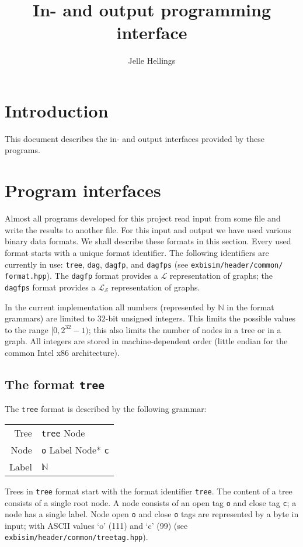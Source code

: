 \documentclass{article}
\title{In- and output programming interface}
\author{Jelle Hellings}
\makeatletter
\newenvironment{grammar}{\begin{tabular}{r@{ $~\longleftarrow~$ }l}}{\end{tabular}}
\newcommand{\grammarrule}[2]{#1&#2\\}
\newcommand{\List}{\mathcal{L}}
\newcommand{\ListSummary}{{\List_\mathcal{S}}}
\makeatother
\begin{document}
\maketitle

\section{Introduction}
This document describes the in- and output interfaces provided by these programs.

\section{Program interfaces}
Almost all programs developed for this project read input from some file and write the results to another file. For this input and output we have used various binary data formats. We shall describe these formats in this section. Every used format starts with a unique format identifier. The following identifiers are currently in use: {\tt tree}, {\tt dag}, {\tt dagfp}, and {\tt dagfps} (see {\tt exbisim/header/common/\\format.hpp}). The {\tt dagfp} format provides a $\List$ representation of graphs; the {\tt dagfps} format provides a $\ListSummary$ representation of graphs.

In the current implementation all numbers (represented by $\mathbb{N}$ in the format grammars) are limited to $32$-bit unsigned integers. This limits the possible values to the range $[0, 2^{32} - 1)$; this also limits the number of nodes in a tree or in a graph. All integers are stored in machine-dependent order (little endian for the common Intel x86 architecture).

\subsection{The format {\tt tree}}
The {\tt tree} format is described by the following grammar:

\begin{grammar}
\grammarrule{Tree}{{\tt tree} Node}
\grammarrule{Node}{{\tt o} Label Node* {\tt c}}
\grammarrule{Label}{$\mathbb{N}$}
\end{grammar}

Trees in {\tt tree} format start with the format identifier {\tt tree}. The content of a tree consists of a single root node. A node consists of an open tag {\tt o} and close tag {\tt c}; a node has a single label. Node open {\tt o} and close {\tt o} tags are represented by a byte in input; with ASCII values `o' (111) and `c' (99) (see {\tt exbisim/header/common/treetag.hpp}).
 
\end{document}
